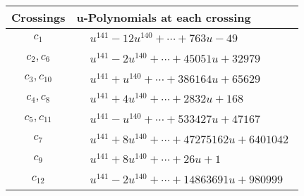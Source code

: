 \documentclass[1p]{elsarticle_modified}
\theoremstyle{definition}
\begin{document}
\begin{tabular}{m{50pt}|m{274pt}}
Crossings & \hspace{64pt}u-Polynomials at each crossing \\
\hline $$\begin{aligned}c_{1}\end{aligned}$$&$\begin{aligned}
&u^{141}-12 u^{140}+\cdots+763 u-49
\end{aligned}$\\
\hline $$\begin{aligned}c_{2},c_{6}\end{aligned}$$&$\begin{aligned}
&u^{141}-2 u^{140}+\cdots+45051 u+32979
\end{aligned}$\\
\hline $$\begin{aligned}c_{3},c_{10}\end{aligned}$$&$\begin{aligned}
&u^{141}+u^{140}+\cdots+386164 u+65629
\end{aligned}$\\
\hline $$\begin{aligned}c_{4},c_{8}\end{aligned}$$&$\begin{aligned}
&u^{141}+4 u^{140}+\cdots+2832 u+168
\end{aligned}$\\
\hline $$\begin{aligned}c_{5},c_{11}\end{aligned}$$&$\begin{aligned}
&u^{141}- u^{140}+\cdots+533427 u+47167
\end{aligned}$\\
\hline $$\begin{aligned}c_{7}\end{aligned}$$&$\begin{aligned}
&u^{141}+8 u^{140}+\cdots+47275162 u+6401042
\end{aligned}$\\
\hline $$\begin{aligned}c_{9}\end{aligned}$$&$\begin{aligned}
&u^{141}+8 u^{140}+\cdots+26 u+1
\end{aligned}$\\
\hline $$\begin{aligned}c_{12}\end{aligned}$$&$\begin{aligned}
&u^{141}-2 u^{140}+\cdots+14863691 u+980999
\end{aligned}$\\
\hline
\end{tabular}\\~\\
\end{document}
